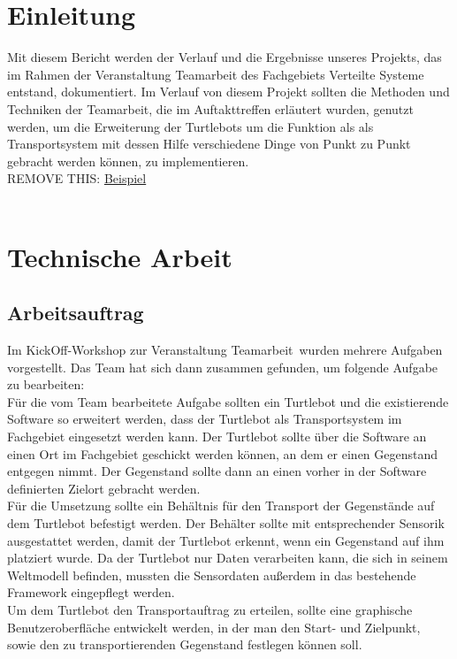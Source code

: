 \documentclass[a4paper,12pt,headsepline]{scrartcl}
\begin{document}
	\tableofcontents
	\newpage
	
	\section{Einleitung}
Mit diesem Bericht werden der Verlauf und die Ergebnisse unseres Projekts, das im Rahmen der Veranstaltung Teamarbeit des Fachgebiets Verteilte Systeme entstand, dokumentiert. Im Verlauf von diesem Projekt sollten die Methoden und Techniken der Teamarbeit, die im Auftakttreffen erläutert wurden, genutzt werden, um die Erweiterung der Turtlebots um die Funktion als als Transportsystem mit dessen Hilfe verschiedene Dinge von Punkt zu Punkt gebracht werden können, zu implementieren.\\
		REMOVE THIS: \href{https://docs.google.com/document/d/1wGlFley6lwhnpLsj8ms7M6fnOjplazlHNr8Bfbv3vso/edit}{Beispiel}\\\\
	\newpage
	\section{Technische Arbeit}
	
	\subsection{Arbeitsauftrag}
		Im KickOff-Workshop zur Veranstaltung \glqq Teamarbeit\grqq\ wurden mehrere Aufgaben vorgestellt. Das Team hat sich dann zusammen gefunden, um folgende Aufgabe zu bearbeiten: \\
		Für die vom Team bearbeitete Aufgabe sollten ein Turtlebot und die existierende Software so erweitert werden, dass der Turtlebot als Transportsystem im Fachgebiet eingesetzt werden kann. Der Turtlebot sollte über die Software an einen Ort im Fachgebiet geschickt werden können, an dem er einen Gegenstand entgegen nimmt. Der Gegenstand sollte dann an einen vorher in der Software definierten Zielort gebracht werden. \\
		Für die Umsetzung sollte ein Behältnis  für den Transport der Gegenstände auf dem Turtlebot befestigt werden. Der Behälter sollte mit entsprechender Sensorik ausgestattet werden, damit der Turtlebot erkennt, wenn ein Gegenstand auf ihm platziert wurde. Da der Turtlebot nur Daten verarbeiten kann, die sich in seinem Weltmodell befinden, mussten die Sensordaten außerdem in das bestehende Framework eingepflegt werden.\\
		Um dem Turtlebot den Transportauftrag zu erteilen, sollte eine graphische Benutzeroberfläche entwickelt werden, in der man den Start- und Zielpunkt, sowie den zu transportierenden Gegenstand festlegen können soll.  
\end{document}
